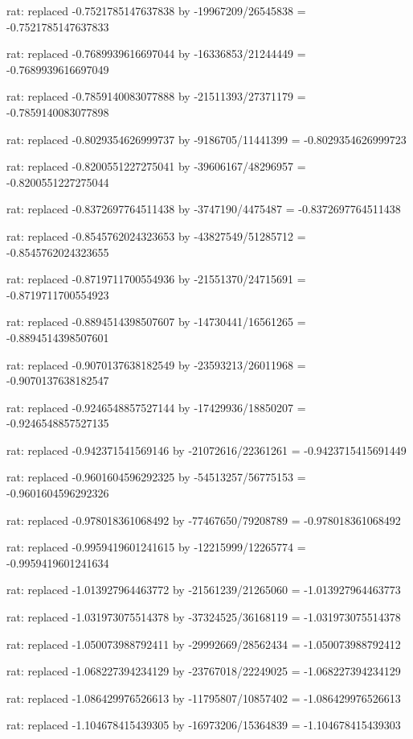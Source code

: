 \documentclass[a4paper,10pt]{article}
\begin{document}
\begin{eulernotebook}
\begin{eulercomment}
\begin{eulercomment}
\begin{eulercomment}
\begin{eulercomment}
\begin{eulercomment}
\begin{eulercomment}
\begin{eulercomment}
\begin{eulercomment}
\begin{eulercomment}
\begin{eulercomment}
\begin{eulercomment}
\begin{eulercomment}
\begin{eulercomment}
\begin{eulercomment}
\begin{eulercomment}
\begin{eulercomment}
\begin{euleroutput}
  rat: replaced -0.7521785147637838 by -19967209/26545838 = -0.7521785147637833
  
  rat: replaced -0.7689939616697044 by -16336853/21244449 = -0.7689939616697049
  
  rat: replaced -0.7859140083077888 by -21511393/27371179 = -0.7859140083077898
  
  rat: replaced -0.8029354626999737 by -9186705/11441399 = -0.8029354626999723
  
  rat: replaced -0.8200551227275041 by -39606167/48296957 = -0.8200551227275044
  
  rat: replaced -0.8372697764511438 by -3747190/4475487 = -0.8372697764511438
  
  rat: replaced -0.8545762024323653 by -43827549/51285712 = -0.8545762024323655
  
  rat: replaced -0.8719711700554936 by -21551370/24715691 = -0.8719711700554923
  
  rat: replaced -0.8894514398507607 by -14730441/16561265 = -0.8894514398507601
  
  rat: replaced -0.9070137638182549 by -23593213/26011968 = -0.9070137638182547
  
  rat: replaced -0.9246548857527144 by -17429936/18850207 = -0.9246548857527135
  
  rat: replaced -0.942371541569146 by -21072616/22361261 = -0.9423715415691449
  
  rat: replaced -0.9601604596292325 by -54513257/56775153 = -0.9601604596292326
  
  rat: replaced -0.978018361068492 by -77467650/79208789 = -0.978018361068492
  
  rat: replaced -0.9959419601241615 by -12215999/12265774 = -0.9959419601241634
  
  rat: replaced -1.013927964463772 by -21561239/21265060 = -1.013927964463773
  
  rat: replaced -1.031973075514378 by -37324525/36168119 = -1.031973075514378
  
  rat: replaced -1.050073988792411 by -29992669/28562434 = -1.050073988792412
  
  rat: replaced -1.068227394234129 by -23767018/22249025 = -1.068227394234129
  
  rat: replaced -1.086429976526613 by -11795807/10857402 = -1.086429976526613
  
  rat: replaced -1.104678415439305 by -16973206/15364839 = -1.104678415439303
  

\end{euleroutput}
\end{eulercomment}
\end{eulercomment}
\end{eulercomment}
\end{eulercomment}
\end{eulercomment}
\end{eulercomment}
\end{eulercomment}
\end{eulercomment}
\end{eulercomment}
\end{eulercomment}
\end{eulercomment}
\end{eulercomment}
\end{eulercomment}
\end{eulercomment}
\end{eulercomment}
\end{eulercomment}
\end{eulernotebook}
\end{document}
